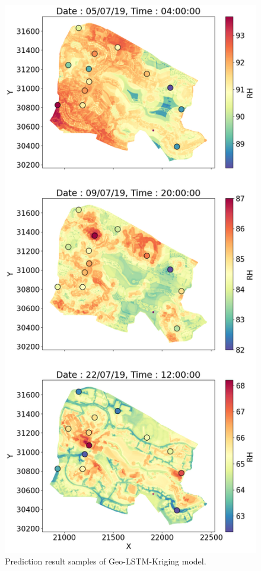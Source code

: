 \documentclass[a4paper,fleqn]{cas-sc}
\begin{document}
\begin{figure}[!h]
    \includegraphics[scale=0.3]{figs/new_figs/RH_campusplot.png}
	\caption{Prediction result samples of Geo-LSTM-Kriging model.}
	\label{FIG:predictionResultCampus}
\end{figure}
\end{document}
